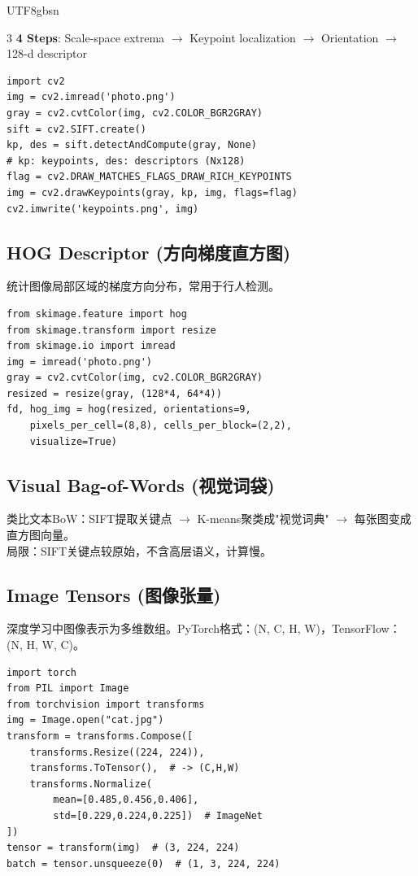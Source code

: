\documentclass[9pt,landscape,a4paper]{article}
\newcommand{\zhint}[1]{{\scriptsize\color{gray!70!black}#1}}
\begin{document}
\begin{CJK}{UTF8}{gbsn}
\begin{multicols}{3}
\textbf{4 Steps}: Scale-space extrema $\to$ Keypoint localization $\to$ Orientation $\to$ 128-d descriptor

\begin{lstlisting}
import cv2
img = cv2.imread('photo.png')
gray = cv2.cvtColor(img, cv2.COLOR_BGR2GRAY)
sift = cv2.SIFT.create()
kp, des = sift.detectAndCompute(gray, None)
# kp: keypoints, des: descriptors (Nx128)
flag = cv2.DRAW_MATCHES_FLAGS_DRAW_RICH_KEYPOINTS
img = cv2.drawKeypoints(gray, kp, img, flags=flag)
cv2.imwrite('keypoints.png', img)
\end{lstlisting}

\subsection{HOG Descriptor \zhint{(方向梯度直方图)}}
\zhint{统计图像局部区域的梯度方向分布，常用于行人检测。}

\begin{lstlisting}
from skimage.feature import hog
from skimage.transform import resize
from skimage.io import imread
img = imread('photo.png')
gray = cv2.cvtColor(img, cv2.COLOR_BGR2GRAY)
resized = resize(gray, (128*4, 64*4))
fd, hog_img = hog(resized, orientations=9,
    pixels_per_cell=(8,8), cells_per_block=(2,2),
    visualize=True)
\end{lstlisting}

\subsection{Visual Bag-of-Words \zhint{(视觉词袋)}}
\zhint{类比文本BoW：SIFT提取关键点 $\to$ K-means聚类成"视觉词典" $\to$ 每张图变成直方图向量。}\\
\zhint{局限：SIFT关键点较原始，不含高层语义，计算慢。}

\subsection{Image Tensors \zhint{(图像张量)}}
\zhint{深度学习中图像表示为多维数组。PyTorch格式：(N, C, H, W)，TensorFlow：(N, H, W, C)。}

\begin{lstlisting}
import torch
from PIL import Image
from torchvision import transforms
img = Image.open("cat.jpg")
transform = transforms.Compose([
    transforms.Resize((224, 224)),
    transforms.ToTensor(),  # -> (C,H,W)
    transforms.Normalize(
        mean=[0.485,0.456,0.406],
        std=[0.229,0.224,0.225])  # ImageNet
])
tensor = transform(img)  # (3, 224, 224)
batch = tensor.unsqueeze(0)  # (1, 3, 224, 224)
\end{lstlisting}


\end{multicols}
\end{CJK}
\end{document}
